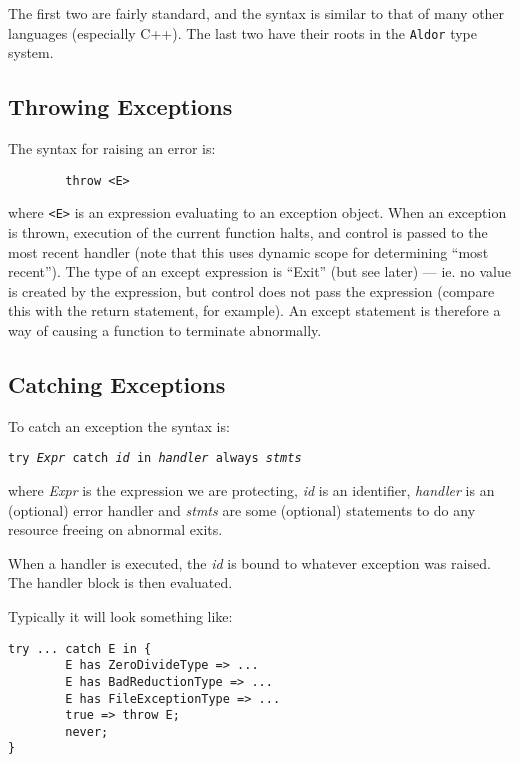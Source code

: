 \documentclass{article}
\newcommand{\Aldor}{{\tt Aldor}}
\begin{document}
The first two are fairly standard, and the syntax is similar to that
of many other languages (especially C++).  The last two have their
roots in the \Aldor{} type system.

\subsection{Throwing Exceptions}

The syntax for raising an error is:
\begin{verbatim}
        throw <E>
\end{verbatim}

where {\tt <E>} is an expression evaluating to an exception object.
When an exception is thrown, execution of the current function halts,
and control is passed to the most recent handler (note that this uses
dynamic scope for determining ``most recent'').  The type of an except
expression is ``Exit'' (but see later) --- ie. no value is created by
the expression, but control does not pass the expression (compare this
with the return statement, for example).  An except statement is
therefore a way of causing a function to terminate abnormally.


\subsection{Catching Exceptions}

To catch an exception the syntax is:

\begin{center}
{\tt try {\em Expr} catch {\em id} in {\em handler} always {\em stmts}}
\end{center}


where {\em Expr} is the expression we are protecting, {\em id} is an
identifier, {\em handler} is an (optional) error handler and {\em
stmts} are some (optional) statements to do any resource freeing on
abnormal exits.

When a handler is executed, the {\em id} is bound to whatever exception
was raised.  The handler block is then evaluated.

Typically it will look something like:

\begin{verbatim}
try ... catch E in {
        E has ZeroDivideType => ...
        E has BadReductionType => ...
        E has FileExceptionType => ...
        true => throw E;
        never;
}
\end{verbatim}
\end{document}
